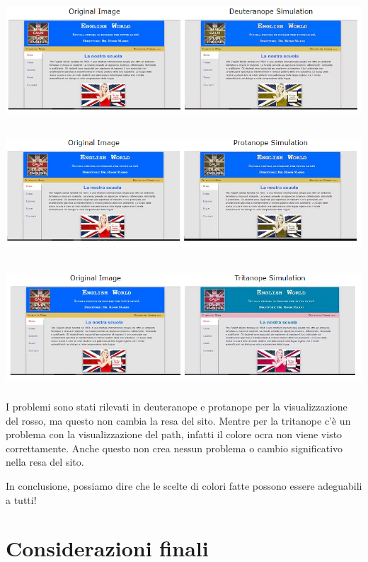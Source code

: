 \documentclass[12pt, a4paper]{article}
\begin{document}
\includegraphics[height=4.5cm]{img/Deuteranope.PNG}\par
\includegraphics[height=4.5cm]{img/Protanope.PNG}\par
\includegraphics[height=4.5cm]{img/Tritanope.PNG}\par

I problemi sono stati rilevati in deuteranope e protanope per la visualizzazione del rosso,
ma questo non cambia la resa del sito. Mentre per la tritanope c’è un problema con la
visualizzazione del path, infatti il colore ocra non viene visto correttamente. Anche questo non crea nessun problema o cambio significativo nella resa del sito.\par

In conclusione, possiamo dire che le scelte di colori fatte possono essere adeguabili a tutti!

\section{Considerazioni finali}
\end{document}
